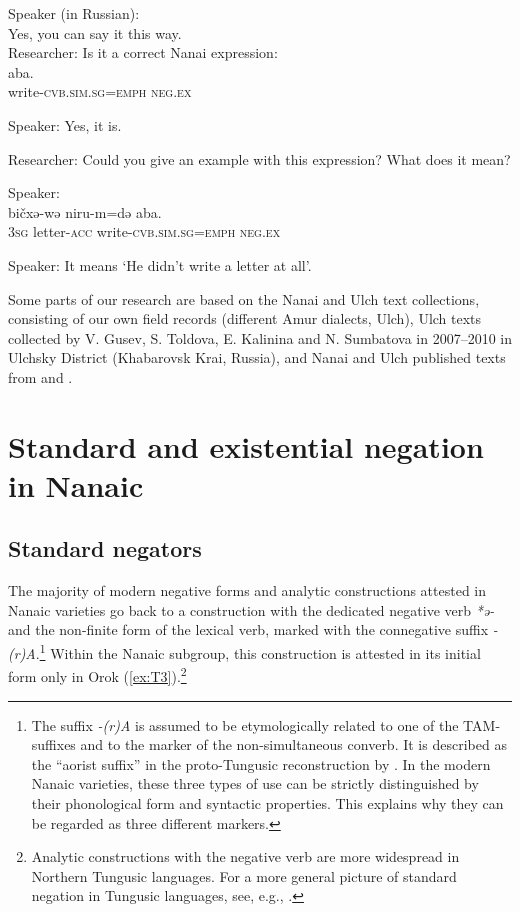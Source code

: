 \documentclass[output=paper,colorlinks,citecolor=brown]{langscibook}
\begin{document}
    Speaker (in  {}     Russian):\\
    {Yes, you can say it this way.} \\
\medskip
\ex  Researcher:  {Is it a correct Nanai expression:} \\
      {{aba.}} \\
    {write-\textsc{cvb.sim.sg=emph}}   {\textsc{neg.ex}} \\
\medskip

    Speaker:  {Yes, it is.} \\
\clearpage


    Researcher:  {Could you give an example with this expression? What does it mean?} \\
    \medskip

    Speaker:\\
      {bičxə-wə}  {niru-m=də}  {{aba.}} \\
    \textsc{3sg}  letter-\textsc{acc}  write-\textsc{cvb.sim.sg=emph}  {\textsc{neg.ex}} \\
\medskip

    Speaker:  {It means ‘He didn’t write a letter at all’.}
\z
\z

Some parts of our research are based on the Nanai and Ulch text collections, consisting of our own field records (different Amur dialects, Ulch), Ulch texts collected by V. Gusev, S. Toldova, E. Kalinina and N. Sumbatova in 2007–2010 in Ulchsky District (Khabarovsk Krai, Russia), and Nanai and Ulch published texts from \citet{avrorin1986a} and \citet{sunik1985a}.

\section{Standard and existential negation in Nanaic}\label{sec:T4}
\subsection{Standard negators}\label{sec:T4.1}

The majority of modern negative forms and analytic constructions attested in Nanaic varieties go back to a construction with the dedicated negative verb \textit{*ə-} and the non-finite form of the lexical verb, marked with the connegative suffix \textit{-(r)A}.\footnote{\label{footnote:4}The suffix \textit{-(r)A} is assumed to be etymologically related to one of the TAM-suffixes and to the marker of the non-simultaneous converb. It is described as the “aorist suffix” in the proto-Tungusic reconstruction by \citet[124 ff., 146]{benzing1955a}. In the modern Nanaic varieties, these three types of use can be strictly distinguished by their phonological form and syntactic properties. This explains why they can be regarded as three different markers.} Within the Nanaic subgroup, this construction is attested in its initial form only in Orok (\ref{ex:T3}).\footnote{Analytic constructions with the negative verb are more widespread in Northern Tungusic languages. For a more general picture of standard negation in Tungusic languages, see, e.g., \citet{hoelzl2015a}.}
\end{document}

